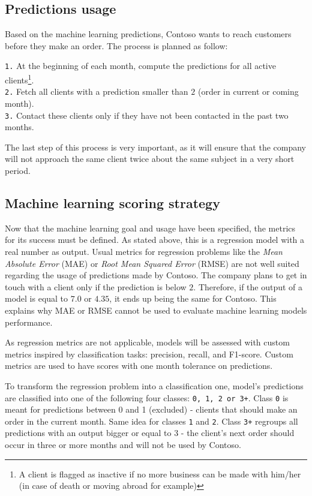 \subsection{Predictions usage}
Based on the machine learning predictions, Contoso wants to reach customers before they make an order. The process is planned as follow:

\noindent\hspace*{0.8cm}  \texttt{1.} At the beginning of each month, compute the predictions for all active clients\footnote{A client is flagged as inactive if no more business can be made with him/her (in case of death or moving abroad for example)}. \\
\hspace*{0.8cm}           \texttt{2.} Fetch all clients with a prediction smaller than $2$ (order in current or coming month). \\
\hspace*{0.8cm}           \texttt{3.} Contact these clients only if they have not been contacted in the past two months.

The last step of this process is very important, as it will ensure that the company will not approach the same client twice about the same subject in a very short period.


\subsection{Machine learning scoring strategy}
Now that the machine learning goal and usage have been specified, the metrics for its success must be defined. As stated above, this is a regression model with a real number as output. Usual metrics for regression problems like the \textit{Mean Absolute Error} (MAE) or \textit{Root Mean Squared Error} (RMSE) are not well suited regarding the usage of predictions made by Contoso. The company plans to get in touch with a client only if the prediction is below $2$. Therefore, if the output of a model is equal to $7.0$ or $4.35$, it ends up being the same for Contoso. This explains why MAE or RMSE cannot be used to evaluate machine learning models performance. 

As regression metrics are not applicable, models will be assessed with custom metrics inspired by classification tasks: precision, recall, and F1-score. Custom metrics are used to have scores with one month tolerance on predictions.

To transform the regression problem into a classification one, model's predictions are classified into one of the following four classes: \texttt{0, 1, 2 or 3+}. Class \texttt{0} is meant for predictions between 0 and 1 (excluded) - clients that should make an order in the current month. Same idea for classes \texttt{1} and \texttt{2}. Class \texttt{3+} regroups all predictions with an output bigger or equal to 3 - the client's next order should occur in three or more months and will not be used by Contoso.

